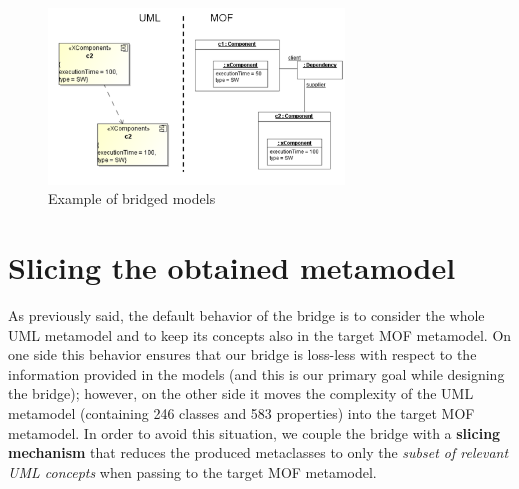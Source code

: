 \begin{figure}[htbp]
	\centering
		\includegraphics[width=0.70\textwidth]{figures/modelingExample.png}
	\caption{Example of bridged models}
	\label{fig:modelingExample}
\end{figure}
%



\section{Slicing the obtained metamodel}\label{sec:slicing}

As previously said, the default behavior of the bridge is to consider the whole UML metamodel and to keep its concepts also in the
target MOF metamodel. On one side this behavior ensures that our bridge is loss-less with respect to the information
provided in the models (and this is our primary goal while designing the bridge);
however, on the other side it moves the complexity of the UML metamodel (containing 246 classes and 583 properties)
into the target MOF metamodel.
In order to avoid this situation, we couple the bridge with a \textbf{slicing mechanism} that reduces the produced metaclasses
to only the \textit{subset of relevant UML concepts} when passing to the target MOF metamodel.


